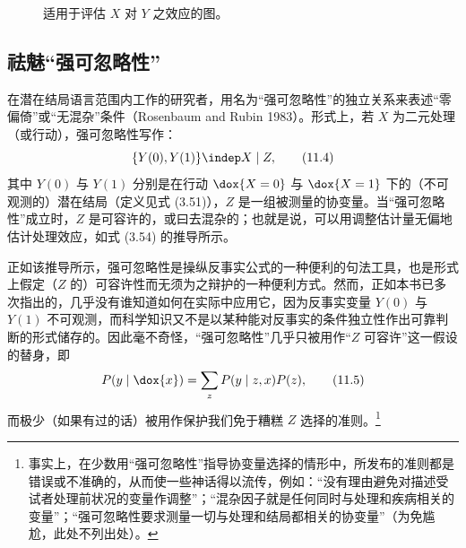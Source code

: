 \begin{figure}[htbp]
\centering
{}
\caption{适用于评估 $X$ 对 $Y$ 之效应的图。}
\label{fig:11.6}
\end{figure}

\subsection{祛魅“强可忽略性”}

在潜在结局语言范围内工作的研究者，用名为“强可忽略性”的独立关系来表述“零偏倚”或“无混杂”条件（Rosenbaum and Rubin 1983）。形式上，若 $X$ 为二元处理（或行动），强可忽略性写作：
\begin{equation}
\{Y(0),Y(1)\}\indep X\mid Z, \tag{11.4}
\end{equation}
其中 $Y(0)$ 与 $Y(1)$ 分别是在行动 $\dox{X=0}$ 与 $\dox{X=1}$ 下的（不可观测的）潜在结局（定义见式 (3.51)），$Z$ 是一组被测量的协变量。当“强可忽略性”成立时，$Z$ 是可容许的，或曰去混杂的；也就是说，可以用调整估计量无偏地估计处理效应，如式 (3.54) 的推导所示。

正如该推导所示，强可忽略性是操纵反事实公式的一种便利的句法工具，也是形式上假定（$Z$ 的）可容许性而无须为之辩护的一种便利方式。然而，正如本书已多次指出的，几乎没有谁知道如何在实际中应用它，因为反事实变量 $Y(0)$ 与 $Y(1)$ 不可观测，而科学知识又不是以某种能对反事实的条件独立性作出可靠判断的形式储存的。因此毫不奇怪，“强可忽略性”几乎只被用作“$Z$ 可容许”这一假设的替身，即
\begin{equation}
P(y\mid\dox{x})=\sum_{z}P(y\mid z,x)P(z), \tag{11.5}
\end{equation}
而极少（如果有过的话）被用作保护我们免于糟糕 $Z$ 选择的准则。\footnote{事实上，在少数用“强可忽略性”指导协变量选择的情形中，所发布的准则都是错误或不准确的，从而使一些神话得以流传，例如：“没有理由避免对描述受试者处理前状况的变量作调整”；“混杂因子就是任何同时与处理和疾病相关的变量”；“强可忽略性要求测量一切与处理和结局都相关的协变量”（为免尴尬，此处不列出处）。}

